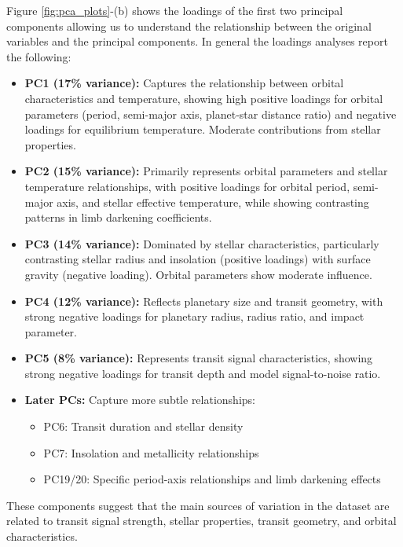 Figure \ref{fig:pca_plots}-(b) shows the loadings of the first two principal components allowing us to understand the relationship between the original variables and the principal components. In general the loadings analyses report the following:
\begin{itemize}
    \item \textbf{PC1 (17\% variance):} Captures the relationship between orbital characteristics and temperature, showing high positive loadings for orbital parameters (period, semi-major axis, planet-star distance ratio) and negative loadings for equilibrium temperature. Moderate contributions from stellar properties.
    \item \textbf{PC2 (15\% variance):} Primarily represents orbital parameters and stellar temperature relationships, with positive loadings for orbital period, semi-major axis, and stellar effective temperature, while showing contrasting patterns in limb darkening coefficients.
    \item \textbf{PC3 (14\% variance):} Dominated by stellar characteristics, particularly contrasting stellar radius and insolation (positive loadings) with surface gravity (negative loading). Orbital parameters show moderate influence.
    \item \textbf{PC4 (12\% variance):} Reflects planetary size and transit geometry, with strong negative loadings for planetary radius, radius ratio, and impact parameter.
    \item \textbf{PC5 (8\% variance):} Represents transit signal characteristics, showing strong negative loadings for transit depth and model signal-to-noise ratio.
    \item \textbf{Later PCs:} Capture more subtle relationships:
    \begin{itemize}
        \item PC6: Transit duration and stellar density
        \item PC7: Insolation and metallicity relationships
        \item PC19/20: Specific period-axis relationships and limb darkening effects
    \end{itemize}
\end{itemize}

These components suggest that the main sources of variation in the dataset are related to transit signal strength, stellar properties, transit geometry, and orbital characteristics.

